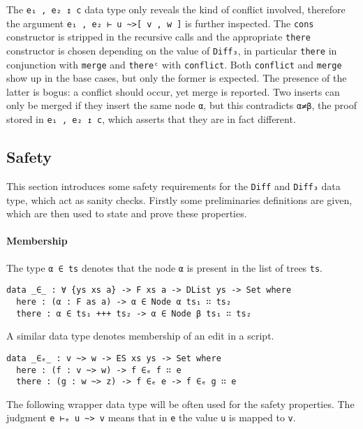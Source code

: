 \documentclass[../Thesis.tex]{subfiles}
\begin{document}
The \texttt{e₁ , e₂ ↥ c} data type only reveals the kind of conflict involved,
therefore the argument \texttt{e₁ , e₂ ⊢ u \textasciitilde>[ v , w ]} 
is further inspected.
The \texttt{cons}  constructor is stripped in the recursive 
calls and the appropriate \texttt{there} constructor is chosen depending on 
the value of \texttt{Diff₃}, in particular \texttt{there} in conjunction with 
\texttt{merge} and \texttt{thereᶜ} with \texttt{conflict}.
Both \texttt{conflict} and \texttt{merge} show up in the base cases, but only
the former is expected.
The presence of the latter is bogus: a conflict should occur, yet merge is reported. Two inserts can only be merged if they insert the same node \texttt{α}, but this contradicts \texttt{α≠β}, the proof stored in 
\texttt{e₁ , e₂ ↥ c}, which asserts that they are in fact different.

	\subsection{Safety}
	\label{subsec:Safety}
	This section introduces some safety requirements for the \texttt{Diff}
	and \texttt{Diff₃} data type, which act as sanity checks. 
	Firstly some preliminaries definitions are given, which 
	are then used to state and prove these properties. 
		
	\paragraph{Membership}
	\label{par:membership}
	The type \texttt{α ∈ ts} denotes that the node \texttt{α} is present
	in the list of trees \texttt{ts}.

\begin{verbatim}
data _∈_ : ∀ {ys xs a} -> F xs a -> DList ys -> Set where
  here : (α : F as a) -> α ∈ Node α ts₁ ∷ ts₂
  there : α ∈ ts₁ +++ ts₂ -> α ∈ Node β ts₁ ∷ ts₂
\end{verbatim}

A similar data type denotes membership of an edit in a script.

\begin{verbatim}
data _∈ₑ_ : v ~> w -> ES xs ys -> Set where
  here : (f : v ~> w) -> f ∈ₑ f ∷ e
  there : (g : w ~> z) -> f ∈ₑ e -> f ∈ₑ g ∷ e
\end{verbatim}
	
	The following wrapper data type will be often used for the 
	safety properties.
	The judgment \texttt{e ⊢ₑ u \textasciitilde> v} means that in 
	\texttt{e} the value \texttt{u} is mapped to \texttt{v}. 
\end{document}
